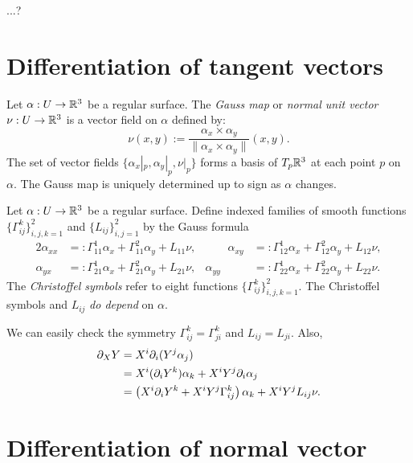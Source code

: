 \documentclass{../note}
\def\a{\alpha}
\begin{document}
\begin{thm}
...?
\end{thm}




\section{Differentiation of tangent vectors}

\begin{defn}
Let $\a:U\to\R^3$ be a regular surface.
The \emph{Gauss map} or \emph{normal unit vector} $\nu:U\to\mathbb{R}^3$ is a vector field on $\a$ defined by:
\[\nu(x,y):=\frac{\a_x\times \a_y}{\|\a_x\times \a_y\|}(x,y).\]
The set of vector fields $\{\a_x|_p,\a_y|_p,\nu|_p\}$ forms a basis of $T_p\mathbb{R}^3$ at each point $p$ on $\a$.
The Gauss map is uniquely determined up to sign as $\a$ changes.
\end{defn}

\begin{defn}
Let $\a:U\to\R^3$ be a regular surface.
Define indexed families of smooth functions $\{\Gamma_{ij}^k\}_{i,j,k=1}^2$ and $\{L_{ij}\}_{i,j=1}^2$ by the Gauss formula
\begin{alignat*}{2}
\a_{xx}&=:\Gamma_{11}^1\a_x+\Gamma_{11}^2\a_y+L_{11}\nu,&\qquad
\a_{xy}&=:\Gamma_{12}^1\a_x+\Gamma_{12}^2\a_y+L_{12}\nu,\\
\a_{yx}&=:\Gamma_{21}^1\a_x+\Gamma_{21}^2\a_y+L_{21}\nu,&
\a_{yy}&=:\Gamma_{22}^1\a_x+\Gamma_{22}^2\a_y+L_{22}\nu.
\end{alignat*}
The \emph{Christoffel symbols} refer to eight functions $\{\Gamma_{ij}^k\}_{i,j,k=1}^2$.
The Christoffel symbols and $L_{ij}$ \emph{do depend} on $\a$.
\end{defn}
We can easily check the symmetry $\Gamma_{ij}^k=\Gamma_{ji}^k$ and $L_{ij}=L_{ji}$.
Also,
\begin{align*}
\pd_XY
&=X^i\pd_i(Y^j\a_j)\\
&=X^i(\pd_iY^k)\a_k+X^iY^j\pd_i\a_j\\
&=\left(X^i\pd_iY^k+X^iY^j\Gamma_{ij}^k\right)\a_k+X^iY^jL_{ij}\nu.
\end{align*}



\section{Differentiation of normal vector}
\end{document}
